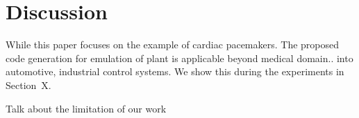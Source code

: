 \section{Discussion}

While this paper focuses on the example of cardiac pacemakers.
The proposed code generation for emulation of plant is applicable 
beyond medical domain.. into automotive, industrial control systems.
We show this during the experiments in Section~X.

Talk about the limitation of our work
